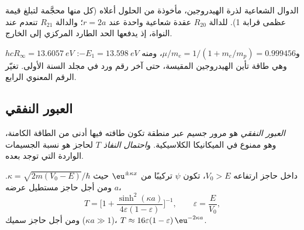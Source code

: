 \begin{omfigure}

{\small الدوال الشعاعية لذرة الهيدروجين، مأخوذة من الحلول أعلاه
(كل منها محجَّمة لتبلغ قيمة عظمى قرابة 1). للدالة $R_{20}$ عقدة شعاعية واحدة عند $r = 2a$؛
والدالة $R_{21}$ تنعدم عند النواة، إذ يدفعها الحد الطارد المركزي إلى الخارج.}
\end{omfigure}

\begin{example}\label{ex:b3:quantum-model-systems:ie}
$hcR_\infty = \qty{13.6057}{eV}$ و$\mu/m_e = 1/(1 + m_e/m_p) = 0.999456$، ومنه
$-E_1 = \qty{13.598}{eV}$: وهي طاقة تأين الهيدروجين المقيسة، حتى
آخر رقم ورد في مجلد السنة الأولى.  تغيّر الرقم
المعنوي الرابع.
\end{example}

\subsection*{العبور النفقي}

\begin{definition}\label{def:b3:quantum-model-systems:tunnelling}
\emph{العبور النفقي} هو مرور جسيم عبر
منطقة تكون طاقته فيها أدنى من الطاقة الكامنة، وهو ممنوع في
الميكانيكا الكلاسيكية. و\emph{احتمال النفاذ}
$T$ لحاجز هو نسبة الجسيمات الواردة التي توجد
بعده.
\end{definition}

\begin{proposition}\label{prop:b3:quantum-model-systems:barrier}
داخل حاجز ارتفاعه $V_0 > E$، تكون $\psi$ تركيبًا من
$\eu^{\pm\kappa x}$ حيث $\kappa = \sqrt{2m(V_0 - E)}/\hbar$. ومن أجل حاجز
مستطيل عرضه $a$،
\[
T = \Big[1 + \frac{\sinh^2(\kappa a)}{4\varepsilon(1-\varepsilon)}\Big]^{-1},
\qquad \varepsilon = \frac{E}{V_0},
\]
ومن أجل حاجز سميك ($\kappa a \gg 1$)، $T \approx 16\varepsilon(1-\varepsilon)
\,\eu^{-2\kappa a}$.
\end{proposition}

